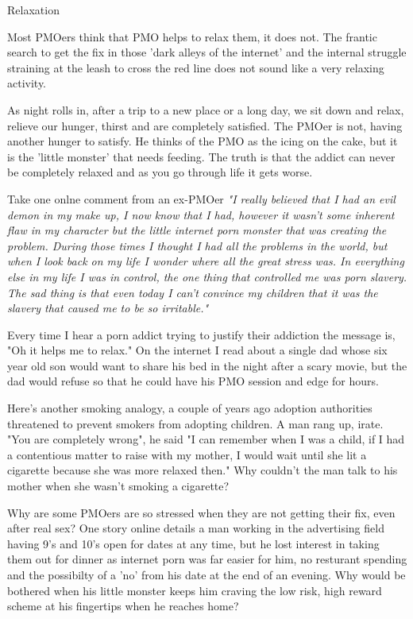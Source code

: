 Relaxation

Most PMOers think that PMO helps to relax them, it does not. The frantic search to get the fix in those 'dark alleys of the internet' and the internal struggle straining at the leash to cross the red line does not sound like a very relaxing activity.

As night rolls in, after a trip to a new place or a long day, we sit down and relax, relieve our hunger, thirst and are completely satisfied. The PMOer is not, having another hunger to satisfy. He thinks of the PMO as the icing on the cake, but it is the 'little monster' that needs feeding. The truth is that the addict can never be completely relaxed and as you go through life it gets worse.

Take one onlne comment from an ex-PMOer
  \textit{"I really believed that I had an evil demon in my make up, I now know that I had, however it wasn't some inherent flaw in my character but the little internet porn monster that was creating the problem. During those times I thought I had all the problems in the world, but when I look back on my life I wonder where all the great stress was. In everything else in my life I was in control, the one thing that controlled me was porn slavery. The sad thing is that even today I can't convince my children that it was the slavery that caused me to be so irritable."}

Every time I hear a porn addict trying to justify their addiction the message is, "Oh it helps me to relax." On the internet I read about a single dad whose six year old son would want to share his bed in the night after a scary movie, but the dad would refuse so that he could have his PMO session and edge for hours.

Here's another smoking analogy, a couple of years ago adoption authorities threatened to prevent smokers from adopting children. A man rang up, irate. "You are completely wrong", he said "I can remember when I was a child, if I had a contentious matter to raise with my mother, I would wait until she lit a cigarette because she was more relaxed then." Why couldn't the man talk to his mother when she wasn't smoking a cigarette?

Why are some PMOers are so stressed when they are not getting their fix, even after real sex? One story online details a man working in the advertising field having 9's and 10's open for dates at any time, but he lost interest in taking them out for dinner as internet porn was far easier for him, no resturant spending and the possibilty of a 'no' from his date at the end of an evening. Why would be bothered when his little monster keeps him craving the low risk, high reward scheme at his fingertips when he reaches home?

